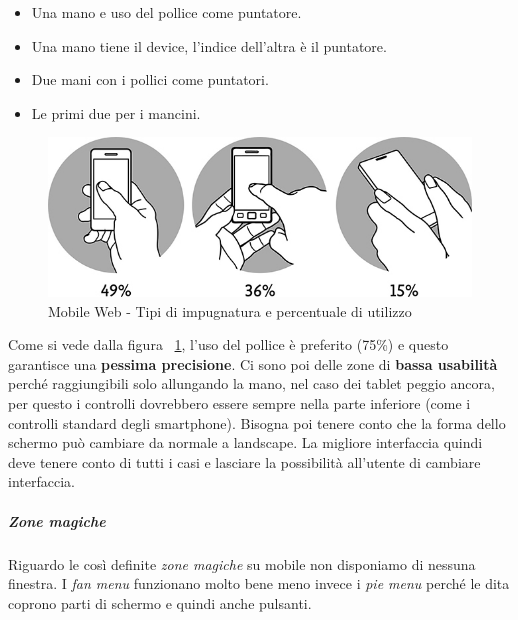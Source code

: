 					\begin{itemize}
						\item Una mano e uso del pollice come puntatore.
						\item Una mano tiene il device, l'indice dell'altra è il puntatore.
						\item Due mani con i pollici come puntatori.
						\item Le primi due per i mancini.
					\end{itemize}
					
					\begin{figure}[h]
						\centering
						\includegraphics[width=\textwidth]{images/MobileWeb-Fitts}	
						\caption[Mobile Web - Impugnature e utilizzo] {Mobile Web - Tipi di impugnatura e percentuale di utilizzo}
						\label{fig:MobileWeb-Fitts}
					\end{figure}
					
					Come si vede dalla figura ~\ref{fig:MobileWeb-Fitts}, l'uso del pollice è preferito (75\%) e questo garantisce una \textbf{pessima precisione}. Ci sono poi delle zone di \textbf{bassa usabilità} perché raggiungibili solo allungando la mano, nel caso dei tablet peggio ancora, per questo i controlli dovrebbero essere sempre nella parte inferiore (come i controlli standard degli smartphone). Bisogna poi tenere conto che la forma dello schermo può cambiare da normale a landscape. La migliore interfaccia quindi deve tenere conto di tutti i casi e lasciare la possibilità all'utente di cambiare interfaccia.
					\subparagraph{Zone magiche}
						Riguardo le così definite \emph{zone magiche} su mobile non disponiamo di nessuna finestra. I \emph{fan menu} funzionano molto bene meno invece i \emph{pie menu} perché le dita coprono parti di schermo e quindi anche pulsanti.
					
